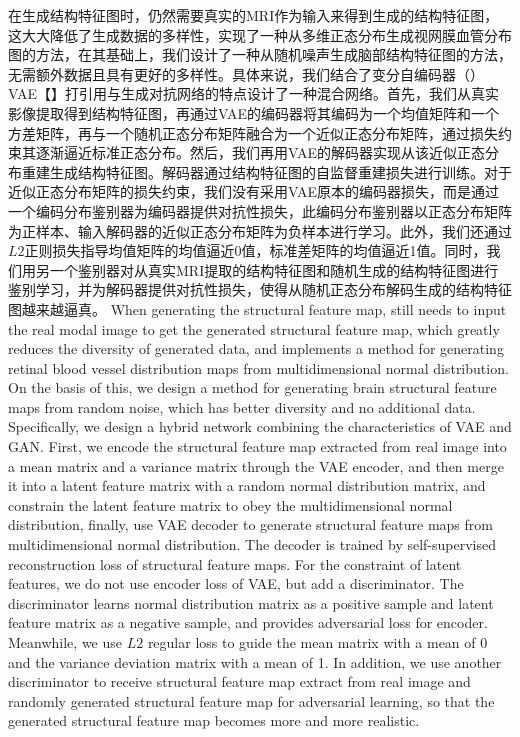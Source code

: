 \documentclass[letterpaper]{article} %
\begin{document}
在生成结构特征图时，\cite{4shin2018medical}仍然需要真实的MRI作为输入来得到生成的结构特征图，这大大降低了生成数据的多样性，\cite{41costa2017towards}实现了一种从多维正态分布生成视网膜血管分布图的方法，在其基础上，我们设计了一种从随机噪声生成脑部结构特征图的方法，无需额外数据且具有更好的多样性。具体来说，我们结合了变分自编码器（）VAE【】打引用与生成对抗网络的特点设计了一种混合网络。首先，我们从真实影像提取得到结构特征图，再通过VAE的编码器将其编码为一个均值矩阵和一个方差矩阵，再与一个随机正态分布矩阵融合为一个近似正态分布矩阵，通过损失约束其逐渐逼近标准正态分布。然后，我们再用VAE的解码器实现从该近似正态分布重建生成结构特征图。解码器通过结构特征图的自监督重建损失进行训练。对于近似正态分布矩阵的损失约束，我们没有采用VAE原本的编码器损失，而是通过一个编码分布鉴别器为编码器提供对抗性损失，此编码分布鉴别器以正态分布矩阵为正样本、输入解码器的近似正态分布矩阵为负样本进行学习。此外，我们还通过$L2$正则损失指导均值矩阵的均值逼近0值，标准差矩阵的均值逼近1值。同时，我们用另一个鉴别器对从真实MRI提取的结构特征图和随机生成的结构特征图进行鉴别学习，并为解码器提供对抗性损失，使得从随机正态分布解码生成的结构特征图越来越逼真。
When generating the structural feature map, \cite{4shin2018medical} still needs to input the real modal image to get the generated structural feature map, which greatly reduces the diversity of generated data, and \cite{41costa2017towards} implements a method for generating retinal blood vessel distribution maps from multidimensional normal distribution. On the basis of this, we design a method for generating brain structural feature maps from random noise, which has better diversity and no additional data. 
Specifically, we design a hybrid network combining the characteristics of VAE and GAN. First, we encode the structural feature map extracted from real image into a mean matrix and a variance matrix through the VAE encoder, and then merge it into a latent feature matrix with a random normal distribution matrix, and constrain the latent feature matrix to obey the multidimensional normal distribution, finally, use VAE decoder to generate structural feature maps from multidimensional normal distribution. The decoder is trained by self-supervised reconstruction loss of structural feature maps. For the constraint of latent features, we do not use encoder loss of VAE, but add a discriminator. The discriminator learns normal distribution matrix as a positive sample and latent feature matrix as a negative sample, and provides adversarial loss for encoder. Meanwhile, we use $L2$ regular loss to guide the mean matrix with a mean of 0 and the variance deviation matrix with a mean of 1. In addition, we use another discriminator to receive structural feature map extract from real image and randomly generated structural feature map for adversarial learning, so that the generated structural feature map becomes more and more realistic.
\end{document}
